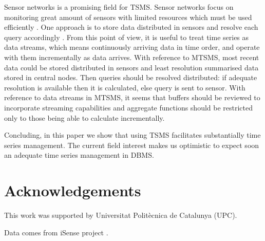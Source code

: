 Sensor networks is a promising field for TSMS. Sensor networks focus
on monitoring great amount of sensors with limited resources which
must be used efficiently \cite{yaogehrke02}. One approach is to store
data distributed in sensors and resolve each query accordingly
\cite{bonnet01}. From this point of view, it is useful to treat time
series as data streams, which means continuously arriving data in time
order, and operate with them incrementally as data arrives.  With
reference to MTSMS, most recent data could be stored distributed in
sensors and least resolution summarised data stored in central
nodes. Then queries should be resolved distributed: if adequate
resolution is available then it is calculated, else query is sent to
sensor.  With reference to data streams in MTSMS, it seems that
buffers should be reviewed to incorporate streaming capabilities and
aggregate functions should be restricted only to those being able
to calculate incrementally.


Concluding, in this paper we show that using TSMS facilitates
substantially time series management. The current field interest makes
us optimistic to expect soon an adequate time series management in
DBMS.


\section*{Acknowledgements}

This work was supported by Universitat Polit\`{e}cnica de Catalunya (UPC).

Data comes from iSense project .








